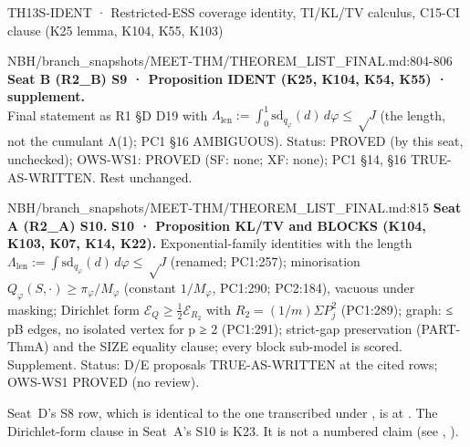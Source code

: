 \begin{card}{TH13}{S-IDENT · Restricted-ESS coverage identity, TI/KL/TV calculus, C15-CI clause (K25 lemma, K104, K55, K103)}
\begin{stmt}{NBH/branch_snapshots/MEET-THM/THEOREM_LIST_FINAL.md:804-806}
\textbf{Seat B (R2\_B) S9 · Proposition IDENT (K25, K104, K54, K55) · supplement.}\\
Final statement as R1 §D D19 with $Λ_{\mathrm{len}} := ∫_0^1 \mathrm{sd}_{q_φ}(d)\,dφ ≤ √J$ (the length, not the cumulant Λ(1); PC1 §16 AMBIGUOUS). Status: PROVED (by this seat, unchecked); OWS-WS1: PROVED (SF: none; XF: none); PC1 §14, §16 TRUE-AS-WRITTEN. Rest unchanged.
\end{stmt}

\begin{stmt}{NBH/branch_snapshots/MEET-THM/THEOREM_LIST_FINAL.md:815}
\textbf{Seat A (R2\_A) S10.} \textbf{S10 · Proposition KL/TV and BLOCKS (K104, K103, K07, K14, K22).} Exponential-family identities with the length $Λ_{\mathrm{len}} := ∫\mathrm{sd}_{q_φ}(d)\,dφ ≤ √J$ (renamed; PC1:257); minorisation $Q_φ(S,\cdot) ≥ π_φ/M_φ$ (constant $1/M_φ$, PC1:290; PC2:184), vacuous under masking; Dirichlet form $ℰ_Q ≥ \tfrac12ℰ_{R_2}$ with $R_2 = (1/m)ΣP_j^2$ (PC1:289); graph: ≤ pB edges, no isolated vertex for p ≥ 2 (PC1:291); strict-gap preservation (PART-ThmA) and the SIZE equality clause; every block sub-model is scored. Supplement. Status: D/E proposals TRUE-AS-WRITTEN at the cited rows; OWS-WS1 PROVED (no review).
\end{stmt}
Seat~D's S8 row, which is identical to the one transcribed under , is at . The Dirichlet-form clause in Seat~A's S10 is K23. It is not a numbered claim (see , ).


\end{card}

